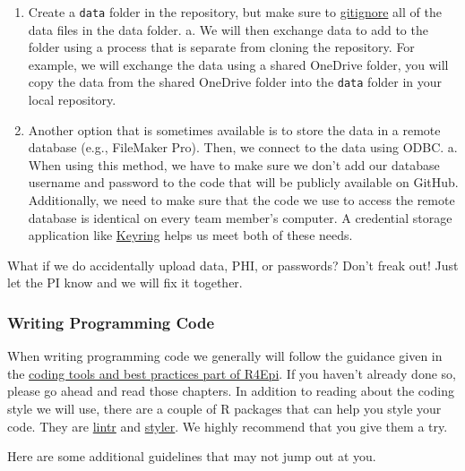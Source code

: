 \documentclass[
  letterpaper,
  DIV=11,
  numbers=noendperiod]{scrreprt}
\providecommand{\tightlist}{%
  \setlength{\itemsep}{0pt}\setlength{\parskip}{0pt}}\usepackage{longtable,booktabs,array}
\begin{document}
\begin{enumerate}
\def\labelenumi{\arabic{enumi}.}
\tightlist
\item
  Create a \texttt{data} folder in the repository, but make sure to
  \href{https://www.r4epi.com/using-git-and-github.html\#step-4-update-and-commit-gitignore}{gitignore}
  all of the data files in the data folder. a. We will then exchange
  data to add to the folder using a process that is separate from
  cloning the repository. For example, we will exchange the data using a
  shared OneDrive folder, you will copy the data from the shared
  OneDrive folder into the \texttt{data} folder in your local
  repository.
\item
  Another option that is sometimes available is to store the data in a
  remote database (e.g., FileMaker Pro). Then, we connect to the data
  using ODBC. a. When using this method, we have to make sure we don't
  add our database username and password to the code that will be
  publicly available on GitHub. Additionally, we need to make sure that
  the code we use to access the remote database is identical on every
  team member's computer. A credential storage application like
  \href{https://github.com/r-lib/keyring}{Keyring} helps us meet both of
  these needs.
\end{enumerate}

What if we do accidentally upload data, PHI, or passwords? Don't freak
out! Just let the PI know and we will fix it together.

\subsubsection{Writing Programming Code}\label{writing-programming-code}

When writing programming code we generally will follow the guidance
given in the \href{https://www.r4epi.com/r-scripts.html}{coding tools
and best practices part of R4Epi}. If you haven't already done so,
please go ahead and read those chapters. In addition to reading about
the coding style we will use, there are a couple of R packages that can
help you style your code. They are
\href{https://lintr.r-lib.org/}{lintr} and
\href{https://styler.r-lib.org/}{styler}. We highly recommend that you
give them a try.

Here are some additional guidelines that may not jump out at you.
\end{document}
